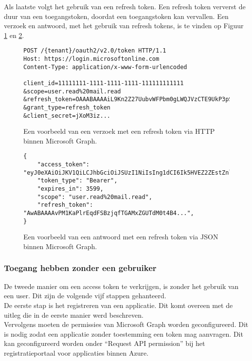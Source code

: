 Als laatste volgt het gebruik van een refresh token. Een refresh token ververst de duur van een toegangstoken, doordat een toegangstoken kan vervallen. Een verzoek en antwoord, met het gebruik van refresh tokens, is te vinden op Figuur \ref{MSGRTR} en \ref{MSGRTRES}.

\begin{figure}[!h]
    \scriptsize
    \begin{verbatim}
POST /{tenant}/oauth2/v2.0/token HTTP/1.1
Host: https://login.microsoftonline.com
Content-Type: application/x-www-form-urlencoded

client_id=11111111-1111-1111-1111-111111111111
&scope=user.read%20mail.read
&refresh_token=OAAABAAAAiL9Kn2Z27UubvWFPbm0gLWQJVzCTE9UkP3pSx1aXxUjq...
&grant_type=refresh_token
&client_secret=jXoM3iz...   
    \end{verbatim}  
    \caption[Voorbeeld Refresh Token request Microsoft Graph]{Een voorbeeld van een verzoek met een refresh token via \ac{HTTP} binnen Microsoft Graph.}
    \label{MSGRTR}
\end{figure}

\begin{figure}[!h]
    \scriptsize
    \begin{verbatim}
{
    "access_token": "eyJ0eXAiOiJKV1QiLCJhbGciOiJSUzI1NiIsIng1dCI6Ik5HVEZ2ZEstZnl0aEV1Q...",
    "token_type": "Bearer",
    "expires_in": 3599,
    "scope": "user.read%20mail.read",
    "refresh_token": "AwABAAAAvPM1KaPlrEqdFSBzjqfTGAMxZGUTdM0t4B4...",
}    
    \end{verbatim}    
    \caption[Voorbeeld Refresh Token response Microsoft Graph]{Een voorbeeld van een antwoord met een refresh token via \ac{JSON} binnen Microsoft Graph.}
    \label{MSGRTRES}
\end{figure}



\subsubsection{Toegang hebben zonder een gebruiker}

De tweede manier om een access token te verkrijgen, is zonder het gebruik van een user. Dit zijn de volgende vijf stappen gehanteerd. \\

De eerste stap is het registreren van een applicatie. Dit komt overeen met de uitleg die in de eerste manier werd beschreven. \\

Vervolgens moeten de permissies van Microsoft Graph worden geconfigureerd. Dit is nodig zodat een applicatie zonder toestemming een token mag aanvragen. Dit kan geconfigureerd worden onder “Request \ac{API} permission” bij het registratieportaal voor applicaties binnen Azure. \\

